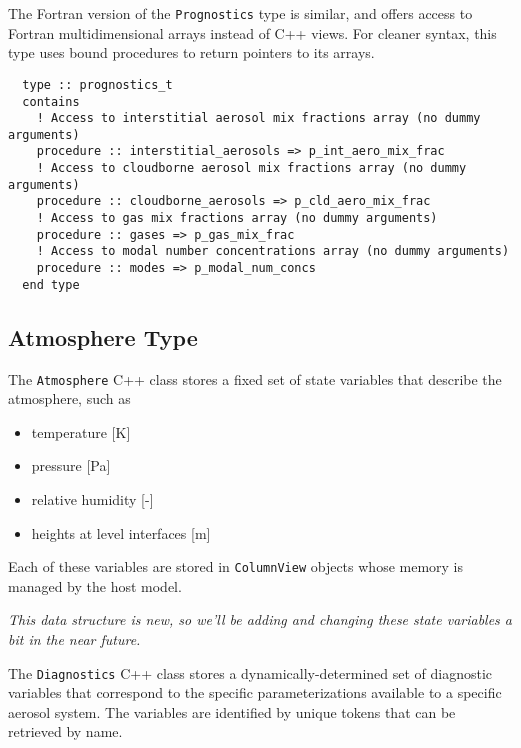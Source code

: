 The Fortran version of the \texttt{Prognostics} type is similar, and offers
access to Fortran multidimensional arrays instead of C++ views. For cleaner
syntax, this type uses bound procedures to return pointers to its arrays.

\begin{lstlisting}
  type :: prognostics_t
  contains
    ! Access to interstitial aerosol mix fractions array (no dummy arguments)
    procedure :: interstitial_aerosols => p_int_aero_mix_frac
    ! Access to cloudborne aerosol mix fractions array (no dummy arguments)
    procedure :: cloudborne_aerosols => p_cld_aero_mix_frac
    ! Access to gas mix fractions array (no dummy arguments)
    procedure :: gases => p_gas_mix_frac
    ! Access to modal number concentrations array (no dummy arguments)
    procedure :: modes => p_modal_num_concs
  end type
\end{lstlisting}

\subsection{Atmosphere Type}

The \texttt{Atmosphere} C++ class stores a fixed set of state variables that
describe the atmosphere, such as

\begin{itemize}
  \item temperature [K]
  \item pressure [Pa]
  \item relative humidity [-]
  \item heights at level interfaces [m]
\end{itemize}

Each of these variables are stored in \texttt{ColumnView} objects whose memory
is managed by the host model.

{\em This data structure is new, so we'll be adding and changing these state
variables a bit in the near future.}

The \texttt{Diagnostics} C++ class stores a dynamically-determined set of
diagnostic variables that correspond to the specific parameterizations available
to a specific aerosol system. The variables are identified by unique tokens that
can be retrieved by name.

